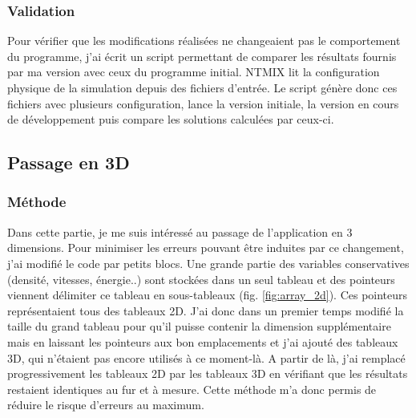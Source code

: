 

\subsubsection{Validation}Pour vérifier que les modifications réalisées ne changeaient pas le comportement du programme, j'ai écrit un script permettant de comparer les résultats fournis par ma version avec ceux du programme initial. NTMIX lit la configuration physique de la simulation depuis des fichiers d'entrée. Le script génère donc ces fichiers avec plusieurs configuration, lance la version initiale, la version en cours de développement puis compare les solutions calculées par ceux-ci.




\subsection{Passage en 3D}

\subsubsection{Méthode}\label{sec:3dmeth}
Dans cette partie, je me suis intéressé au passage de l'application en 3 dimensions. Pour minimiser les erreurs pouvant être induites par ce changement, j'ai modifié le code par petits blocs. Une grande partie des variables conservatives (densité, vitesses, énergie..) sont stockées dans un seul tableau et des pointeurs viennent délimiter ce tableau en sous-tableaux (fig. \ref{fig:array_2d}). Ces pointeurs représentaient tous des tableaux 2D. J'ai donc dans un premier temps modifié la taille du grand tableau pour qu'il puisse contenir la dimension supplémentaire mais en laissant les pointeurs aux bon emplacements et j'ai ajouté des tableaux 3D, qui n'étaient pas encore utilisés à ce moment-là. A partir de là, j'ai remplacé progressivement les tableaux 2D par les tableaux 3D en vérifiant que les résultats restaient identiques au fur et à mesure. Cette méthode m'a donc permis de réduire le risque d'erreurs au maximum.


